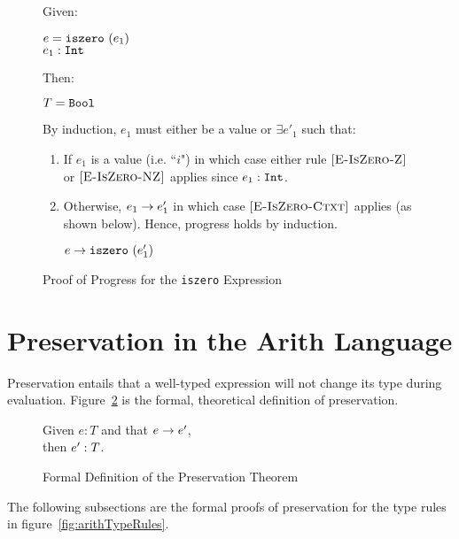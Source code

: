 \documentclass{report}
\newcommand{\rel}[1]{\mbox{\sc [#1]}}
\begin{document}
\begin{figure}[ht!]
Given:
\begin{center}
  $e = \mbox{\tt iszero}~(e_1)$ \\
  ${e_1} : {\mbox{\tt Int}}$
\end{center}
Then:~\\
\begin{center}
   $T = \mbox{\tt Bool}$
\end{center}

By induction, $e_1$ must either be a value or $\exists e'_1$ such that:~\\

	\begin{enumerate}
    \item If $e_1$ is a value (i.e. ``$i$") in which case either rule $\rel{E-IsZero-Z}$ or $\rel{E-IsZero-NZ}$ applies since ${e_1} : {\mbox{\tt Int}}$.

    \item Otherwise, ${e_1} \rightarrow {e'_1}$ in which case $\rel{E-IsZero-Ctxt}$ applies (as shown below). Hence, progress holds by induction.
    
    \begin{center}
      ${e} \rightarrow {\mbox{\tt iszero}~(e'_1)}$
    \end{center}
	
	\end{enumerate}
	
  \caption{Proof of Progress for the \texttt{iszero} Expression}\label{fig:isZeroProofProgress}
\end{figure}

\eject
\section{Preservation in the Arith Language}\label{sec:preservation}

Preservation entails that a well-typed expression will not change its type during evaluation.  Figure~\ref{fig:preservationTheorem} is the formal, theoretical definition of preservation.

\begin{figure}[H]

	Given $e : T$ and that ${e} \rightarrow {e'}$,\\
	then ${e'} : {T}$.
	
  \caption{Formal Definition of the Preservation Theorem}\label{fig:preservationTheorem}
\end{figure}

The following subsections are the formal proofs of preservation for the type rules in figure~\ref{fig:arithTypeRules}. 
\end{document}
